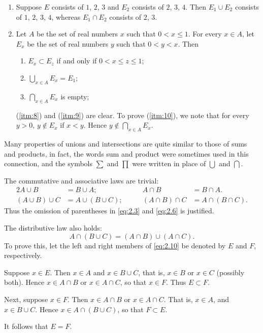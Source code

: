 \begin{example}
    \leavevmode
    \begin{enumerate}
        \item Suppose \(E\) consists of \(1\), \(2\), \(3\) and \(E_2\) consists of \(2\), \(3\), \(4\). Then \(E_1\cup E_2\) consists of \(1\), \(2\), \(3\), \(4\), whereas \(E_1\cap E_2\) consists of \(2\), \(3\).
        \item Let \(A\) be the set of real numbers \(x\) such that \(0<x\leqslant1\). For every \(x\in A\), let \(E_x\) be the set of real numbers \(y\) such that \(0<y<x\). Then
        \begin{enumerate}
            \item\label{itm:8} \(E_x\subset E_z\) if and only if \(0<x\leqslant z\leqslant1\);
            \item\label{itm:9} \(\bigcup_{x\in A}E_x=E_1\);
            \item\label{itm:10} \(\bigcap_{x\in A}E_x\) is empty;
        \end{enumerate}
        (\ref{itm:8}) and (\ref{itm:9}) are clear. To prove (\ref{itm:10}), we note that for every \(y>0\), \(y\notin E_x\) if \(x<y\). Hence \(y\notin\bigcap_{x\in A}E_x\).
    \end{enumerate}
\end{example}

\begin{remarks}
    Many properties of unions and intersections are quite similar to those of sums and products, in fact, the words sum and product were sometimes used in this connection, and the symbols \(\sum\) and \(\prod\) were written in place of \(\bigcup\) and \(\bigcap\).

    The commutative and associative laws are trivial:
    \begin{alignat}{2}
        A\cup B&=B\cup A;\qquad&A\cap B&=B\cap A.\\
        \left(A\cup B\right)\cup C&=A\cup\left(B\cup C\right);\qquad&\left(A\cap B\right)\cap C&=A\cap\left(B\cap C\right).
    \end{alignat}
    Thus the omission of parentheses in \eqref{eq:2.3} and \eqref{eq:2.6} is justified.

    The distributive law also holds:
    \begin{equation}
        A\cap\left(B\cup C\right)=\left(A\cap B\right)\cup\left(A\cap C\right).\label{eq:2.10}
    \end{equation}
    To prove this, let the left and right members of \eqref{eq:2.10} be denoted by \(E\) and \(F\), respectively.

    Suppose \(x\in E\). Then \(x\in A\) and \(x\in B\cup C\), that is, \(x\in B\) or \(x\in C\) (possibly both). Hence \(x\in A\cap B\) or \(x\in A\cap C\), so that \(x\in F\). Thus \(E\subset F\).

    Next, suppose \(x\in F\). Then \(x\in A\cap B\) or \(x\in A\cap C\). That is, \(x\in A\), and \(x\in B\cup C\). Hence \(x\in A\cap\left(B\cup C\right)\), so that \(F\subset E\).

    It follows that \(E=F\).
\end{remarks}


